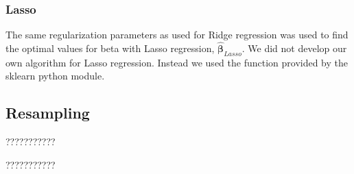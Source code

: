 \subsubsection{Lasso}
The same regularization parameters as used for Ridge regression was used to find the
optimal values for beta with Lasso regression, $\hat{\bm{\beta } } _{Lasso} $. We did not develop our
own algorithm for Lasso regression. Instead we used the function provided by the
sklearn python module.  

\subsection{Resampling}
???????????

???????????

